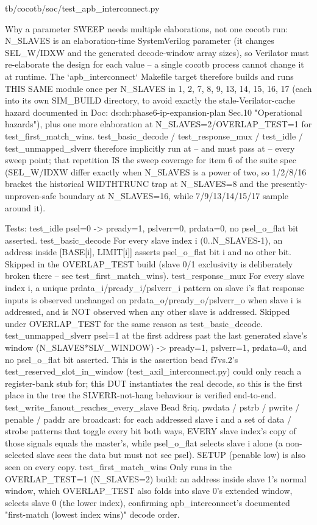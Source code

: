 \begin{relocated}{tb/cocotb/soc/test_apb_interconnect.py}
\begin{textblock}
Why a parameter SWEEP needs multiple elaborations, not one cocotb run: N_SLAVES is an
elaboration-time SystemVerilog parameter (it changes SEL_W/IDXW and the generated decode-window
array sizes), so Verilator must re-elaborate the design for each value -- a single cocotb
process cannot change it at runtime. The `apb_interconnect` Makefile target therefore builds and
runs THIS SAME module once per N_SLAVES in {1, 2, 7, 8, 9, 13, 14, 15, 16, 17} (each into its own
SIM_BUILD directory, to avoid exactly the stale-Verilator-cache hazard documented in
Doc: ds:ch:phase6-ip-expansion-plan Sec.10 "Operational hazards"), plus one more elaboration at
N_SLAVES=2/OVERLAP_TEST=1 for test_first_match_wins. test_basic_decode / test_response_mux /
test_idle / test_unmapped_slverr therefore implicitly run at -- and must pass at -- every sweep
point; that repetition IS the sweep coverage for item 6 of the suite spec (SEL_W/IDXW differ
exactly when N_SLAVES is a power of two, so 1/2/8/16 bracket the historical WIDTHTRUNC trap at
N_SLAVES=8 and the presently-unproven-safe boundary at N_SLAVES=16, while 7/9/13/14/15/17 sample
around it).

Tests:
test_idle
psel=0 -> pready=1, pslverr=0, prdata=0, no psel_o_flat bit asserted.
test_basic_decode
For every slave index i (0..N_SLAVES-1), an address inside [BASE[i], LIMIT[i]] asserts
psel_o_flat bit i and no other bit. Skipped in the OVERLAP_TEST build (slave 0/1
exclusivity is deliberately broken there -- see test_first_match_wins).
test_response_mux
For every slave index i, a unique prdata_i/pready_i/pslverr_i pattern on slave i's flat
response inputs is observed unchanged on prdata_o/pready_o/pslverr_o when slave i is
addressed, and is NOT observed when any other slave is addressed. Skipped under
OVERLAP_TEST for the same reason as test_basic_decode.
test_unmapped_slverr
psel=1 at the first address past the last generated slave's window (N_SLAVES*SLV_WINDOW)
-> pready=1, pslverr=1, prdata=0, and no psel_o_flat bit asserted. This is the assertion
bead f7vs.2's test_reserved_slot_in_window (test_axil_interconnect.py) could only reach a
register-bank stub for; this DUT instantiates the real decode, so this is the first place
in the tree the SLVERR-not-hang behaviour is verified end-to-end.
test_write_fanout_reaches_every_slave
Bead 8riq. pwdata / pstrb / pwrite / penable / paddr are broadcast: for each addressed slave i
and a set of data / strobe patterns that toggle every bit both ways, EVERY slave index's
copy of those signals equals the master's, while psel_o_flat selects slave i alone (a
non-selected slave sees the data but must not see psel). SETUP (penable low) is also seen
on every copy.
test_first_match_wins
Only runs in the OVERLAP_TEST=1 (N_SLAVES=2) build: an address inside slave 1's normal
window, which OVERLAP_TEST also folds into slave 0's extended window, selects slave 0 (the
lower index), confirming apb_interconnect's documented "first-match (lowest index wins)"
decode order.
\end{textblock}

\end{relocated}

